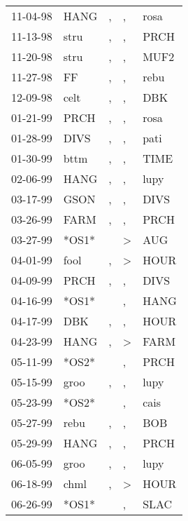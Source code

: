 \begin{supertabular}{lllll}
 11-04-98 &   HANG &             , &             , &   rosa \\
 11-13-98 &   stru &             , &             , &   PRCH \\
 11-20-98 &   stru &             , &             , &   MUF2 \\
 11-27-98 &     FF &             , &             , &   rebu \\
 12-09-98 &   celt &             , &             , &    DBK \\
 01-21-99 &   PRCH &             , &             , &   rosa \\
 01-28-99 &   DIVS &             , &             , &   pati \\
 01-30-99 &   bttm &             , &             , &   TIME \\
 02-06-99 &   HANG &             , &             , &   lupy \\
 03-17-99 &   GSON &             , &             , &   DIVS \\
 03-26-99 &   FARM &             , &             , &   PRCH \\
 03-27-99 &  *OS1* &               &  \textgreater &    AUG \\
 04-01-99 &   fool &             , &  \textgreater &   HOUR \\
 04-09-99 &   PRCH &             , &             , &   DIVS \\
 04-16-99 &  *OS1* &               &             , &   HANG \\
 04-17-99 &    DBK &             , &             , &   HOUR \\
 04-23-99 &   HANG &             , &  \textgreater &   FARM \\
 05-11-99 &  *OS2* &               &             , &   PRCH \\
 05-15-99 &   groo &             , &             , &   lupy \\
 05-23-99 &  *OS2* &               &             , &   cais \\
 05-27-99 &   rebu &             , &             , &    BOB \\
 05-29-99 &   HANG &             , &             , &   PRCH \\
 06-05-99 &   groo &             , &             , &   lupy \\
 06-18-99 &   chml &             , &  \textgreater &   HOUR \\
 06-26-99 &  *OS1* &               &             , &   SLAC \\

\end{supertabular}
